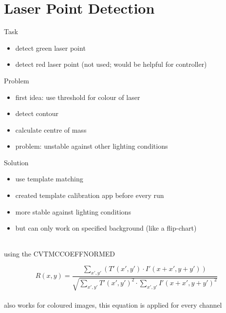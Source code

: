 \documentclass{beamer}
\begin{document}
\section{Laser Point Detection}
\frame{\tableofcontents[currentsection]}

\begin{frame}{Task}

\begin{itemize}
	\item detect green laser point
	\item detect red laser point (not used; would be helpful for controller)
\end{itemize}


\end{frame}

\begin{frame}{Problem}

\begin{itemize}
	\item first idea: use threshold for colour of laser
	\item detect contour 
	\item calculate centre of mass 
	\item problem: unstable against other lighting conditions
\end{itemize}


\end{frame}

\begin{frame}{Solution}

\begin{itemize}
	\item use template matching
	\item created template calibration app before every run
	\item more stable against lighting conditions
	\item but can only work on specified background (like a flip-chart)
\end{itemize}
~\\
using the CV\textunderscore TM\textunderscore CCOEFF\textunderscore NORMED

\begin{equation}
R(x,y) = \frac{\sum_{x',y'} (T'(x',y') \cdot I'(x + x', y + y'))}{\sqrt{\sum_{x',y'} T'(x',y')^{2} \cdot \sum_{x',y'} I'(x + x', y + y')^{2}}}
\end{equation}
~\\
also works for coloured images, this equation is applied for every channel


\end{frame}
\end{document}
